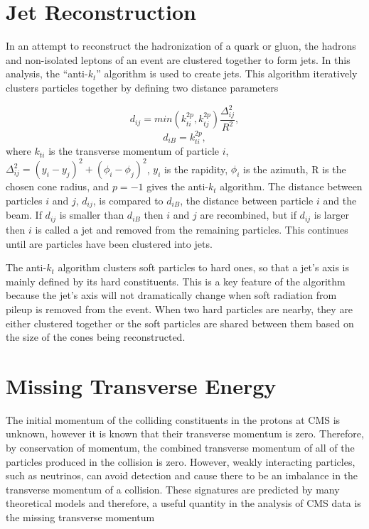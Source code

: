 \section{Jet Reconstruction}
\label{sec:jetReco}
In an attempt to reconstruct the hadronization of a quark or gluon, the hadrons and non-isolated leptons of an event are clustered together to form jets. In this analysis, the ``anti-$k_{t}$'' algorithm is used to create jets. This algorithm iteratively clusters particles together by defining two distance parameters

\begin{equation}
d_{ij}=min(k_{ti}^{2p},k_{tj}^{2p})\frac{\Delta_{ij}^{2}}{R^{2}},
\end{equation}
\begin{equation}
d_{iB} = k_{ti}^{2p},
\end{equation}
where $k_{ti}$ is the transverse momentum of particle $i$, $\Delta_{ij}^{2} = (y_{i}-y_{j})^{2}+(\phi_{i}-\phi_{j})^{2}$, $y_{i}$ is the rapidity, $\phi_{i}$ is the azimuth, R is the chosen cone radius, and $p=-1$ gives the anti-$k_{t}$ algorithm. The distance between particles $i$ and $j$, $d_{ij}$, is compared to $d_{iB}$, the distance between particle $i$ and the beam. If $d_{ij}$ is smaller than $d_{iB}$ then $i$ and $j$ are recombined, but if $d_{ij}$ is larger then $i$ is called a jet and removed from the remaining particles. This continues until are particles have been clustered into jets.

The anti-$k_{t}$ algorithm clusters soft particles to hard ones, so that a jet's axis is mainly defined by its hard constituents. This is a key feature of the algorithm because the jet's axis will not dramatically change when soft radiation from pileup is removed from the event. When two hard particles are nearby, they are either clustered together or the soft particles are shared between them based on the size of the cones being reconstructed. 

\section{Missing Transverse Energy}

The initial momentum of the colliding constituents in the protons at CMS is unknown, however it is known that their transverse momentum is zero. Therefore, by conservation of momentum, the combined transverse momentum of all of the particles produced in the collision is zero. However, weakly interacting particles, such as neutrinos, can avoid detection and cause there to be an imbalance in the transverse momentum of a collision. These signatures are predicted by many theoretical models and therefore, a useful quantity in the analysis of CMS data is the missing transverse momentum

